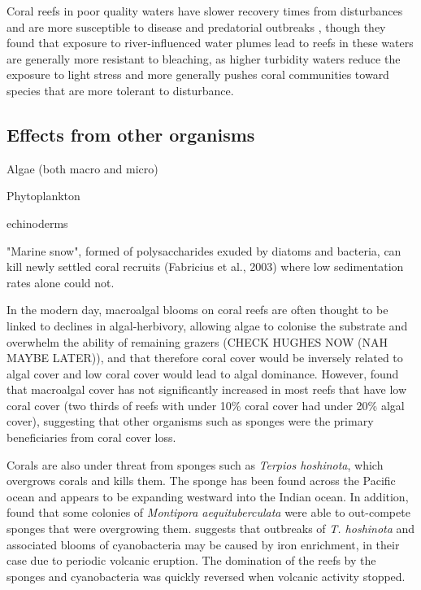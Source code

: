 \documentclass[11pt,a4paper]{article}
\begin{document}
Coral reefs in poor quality waters have slower recovery times from disturbances and are more susceptible to disease and predatorial outbreaks \citep{MacNeil2019}, though they found that exposure to river-influenced water plumes lead to reefs in these waters are generally more resistant to bleaching, as higher turbidity waters reduce the exposure to light stress and more generally pushes coral communities toward species that are more tolerant to disturbance.  




\subsection{Effects from other organisms}

Algae (both macro and micro)

Phytoplankton

echinoderms

"Marine snow", formed of polysaccharides exuded by diatoms and bacteria, can kill newly settled coral recruits (Fabricius et al., 2003) where low sedimentation rates alone could not. 

In the modern day, macroalgal blooms on coral reefs are often thought to be linked to declines in algal-herbivory, allowing algae to colonise the substrate and overwhelm the ability of remaining grazers \citep{Williams2001,Hughes1999} (CHECK HUGHES NOW (NAH MAYBE LATER)), and that therefore coral cover would be inversely related to algal cover and low coral cover would lead to algal dominance.
 However, \cite{Bruno2007} found that macroalgal cover has not significantly increased in most reefs that have low coral cover (two thirds of reefs with under 10\% coral cover had under 20\% algal cover), suggesting that other organisms such as sponges were the primary beneficiaries from coral cover loss.

Corals are also under threat from sponges \citep{Elliott2016} such as \textit{Terpios hoshinota}, which overgrows corals and kills them.
 The sponge has been found across the Pacific ocean and appears to be expanding westward into the Indian ocean. 
  In addition, \cite{Elliott2016} found that some colonies of \textit{Montipora aequituberculata} were able to out-compete sponges that were overgrowing them. 
  \cite{Schils2012} suggests that outbreaks of \textit{T. hoshinota} and associated blooms of cyanobacteria may be caused by iron enrichment, in their case due to periodic volcanic eruption. The domination of the reefs by the sponges and cyanobacteria was quickly reversed when volcanic activity stopped. 
  
\end{document}
